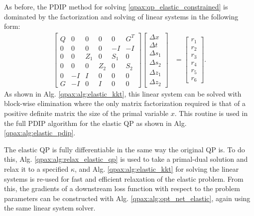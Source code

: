 As before, the PDIP method for solving \eqref{qpax:qp_elastic_constrained} is dominated by the factorization and solving of linear systems in the following form:
    \begin{align}
        \begin{bmatrix}
            Q & 0 & 0   & 0   & 0   & G^T \\
            0 & 0 & 0   & 0   & -I   & -I \\
            0 & 0 & Z_1 & 0   & S_1 & 0 \\
            0 & 0 & 0   & Z_2 & 0   & S_2 \\
            0 & -I & I & 0 & 0 & 0 \\
            G & -I & 0 & I & 0 & 0
        \end{bmatrix} \begin{bmatrix}
            \Delta x \\ \Delta t \\ \Delta s_1 \\ \Delta s_2 \\ \Delta z_1 \\ \Delta z_2
        \end{bmatrix} &= \begin{bmatrix} r_1 \\ r_2 \\ r_3 \\ r_4 \\ r_5 \\ r_6 \end{bmatrix}.
    \end{align}
    As shown in Alg. \eqref{qpax:alg:elastic_kkt}, this linear system can be solved with block-wise elimination where the only matrix factorization required is that of a positive definite matrix the size of the primal variable $x$. This routine is used in the full PDIP algorithm for the elastic QP as shown in Alg. \eqref{qpax:alg:elastic_pdip}.

    The elastic QP is fully differentiable in the same way the original QP is. To do this, Alg. \eqref{qpax:alg:relax_elastic_qp} is used to take a primal-dual solution and relax it to a specified $\kappa$, and  Alg. \eqref{qpax:alg:elastic_kkt} for solving the linear systems is re-used for fast and efficient relaxation of the elastic problem. From this, the gradients of a downstream loss function with respect to the problem parameters can be constructed with Alg. \eqref{qpax:alg:opt_net_elastic}, again using the same linear system solver.


